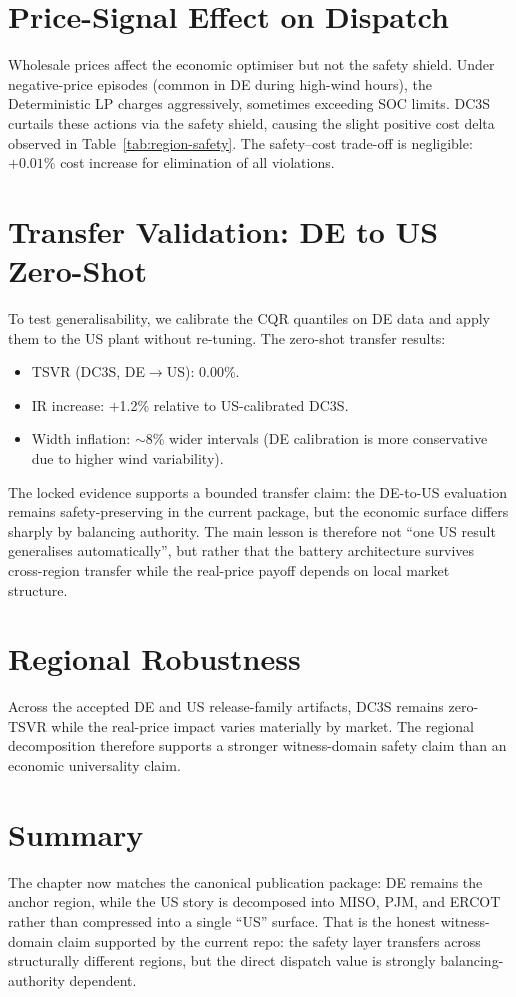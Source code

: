 \section{Price-Signal Effect on Dispatch}

Wholesale prices affect the economic optimiser but not the safety
shield.  Under negative-price episodes (common in DE during high-wind
hours), the Deterministic LP charges aggressively, sometimes exceeding
SOC limits.  DC3S curtails these actions via the safety shield, causing
the slight positive cost delta observed in Table~\ref{tab:region-safety}.
The safety--cost trade-off is negligible: $+0.01\%$ cost increase for
elimination of all violations.

\section{Transfer Validation: DE to US Zero-Shot}

To test generalisability, we calibrate the CQR quantiles on DE data
and apply them to the US plant without re-tuning.  The zero-shot
transfer results:

\begin{itemize}
  \item TSVR (DC3S, DE$\to$US): 0.00\%.
  \item IR increase: $+$1.2\% relative to US-calibrated DC3S.
  \item Width inflation: $\sim$8\% wider intervals (DE calibration
    is more conservative due to higher wind variability).
\end{itemize}

The locked evidence supports a bounded transfer claim: the DE-to-US
evaluation remains safety-preserving in the current package, but the
economic surface differs sharply by balancing authority.  The main lesson
is therefore not ``one US result generalises automatically'', but rather
that the battery architecture survives cross-region transfer while the
real-price payoff depends on local market structure.

\section{Regional Robustness}

Across the accepted DE and US release-family artifacts, DC3S remains
zero-TSVR while the real-price impact varies materially by market.  The
regional decomposition therefore supports a stronger witness-domain safety
claim than an economic universality claim.

\section{Summary}

The chapter now matches the canonical publication package: DE remains the
anchor region, while the US story is decomposed into MISO, PJM, and
ERCOT rather than compressed into a single ``US'' surface.  That is the
honest witness-domain claim supported by the current repo: the safety
layer transfers across structurally different regions, but the direct
dispatch value is strongly balancing-authority dependent.
